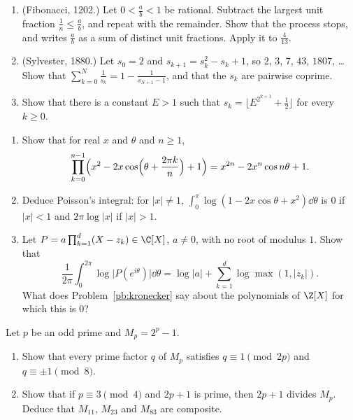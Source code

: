 \begin{exercise}[$\star\star$]\label{pb:sylvester}
\begin{enumerate}[label=(\alph*)]
\item (Fibonacci, 1202.) Let $0<\frac ab<1$ be rational. Subtract the largest unit fraction $\frac1n\le\frac ab$, and repeat
with the remainder. Show that the process stops, and writes $\frac ab$ as a sum of distinct unit fractions. Apply it to
$\frac4{13}$.
\item (Sylvester, 1880.) Let $s_0=2$ and $s_{k+1}=s_k^2-s_k+1$, so $2$, $3$, $7$, $43$, $1807$, \dots Show that
$\sum_{k=0}^N\frac1{s_k}=1-\frac1{s_{N+1}-1}$, and that the $s_k$ are pairwise coprime.
\item Show that there is a constant $E>1$ such that $s_k=\bigl\lfloor E^{2^{k+1}}+\frac12\bigr\rfloor$ for every $k\ge0$.
\end{enumerate}
\end{exercise}

\begin{exercise}[$\star\star$]\label{pb:jensen}
\begin{enumerate}[label=(\alph*)]
\item Show that for real $x$ and $\theta$ and $n\ge1$,
\[
\prod_{k=0}^{n-1}\Bigl(x^2-2x\cos\Bigl(\theta+\frac{2\pi k}n\Bigr)+1\Bigr)=x^{2n}-2x^n\cos n\theta+1.
\]
\item Deduce Poisson's integral: for $|x|\ne1$, $\int_0^\pi\log(1-2x\cos\theta+x^2)\dd\theta$ is $0$ if $|x|<1$ and
$2\pi\log|x|$ if $|x|>1$.
\item Let $P=a\prod_{k=1}^d(X-z_k)\in\C[X]$, $a\ne0$, with no root of modulus $1$. Show that
\[
\frac1{2\pi}\int_0^{2\pi}\log\bigl|P(e^{i\theta})\bigr|\dd\theta=\log|a|+\sum_{k=1}^d\log\max(1,|z_k|).
\]
What does Problem~\ref{pb:kronecker} say about the polynomials of $\Z[X]$ for which this is $0$?
\end{enumerate}
\end{exercise}

\begin{exercise}[$\star$]\label{pb:mersennediv}
Let $p$ be an odd prime and $M_p=2^p-1$.
\begin{enumerate}[label=(\alph*)]
\item Show that every prime factor $q$ of $M_p$ satisfies $q\equiv1\pmod{2p}$ and $q\equiv\pm1\pmod8$.
\item Show that if $p\equiv3\pmod4$ and $2p+1$ is prime, then $2p+1$ divides $M_p$. Deduce that $M_{11}$, $M_{23}$ and
$M_{83}$ are composite.
\end{enumerate}
\end{exercise}

